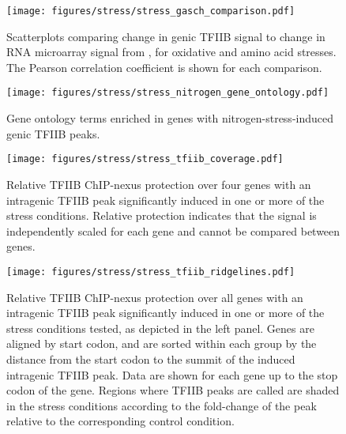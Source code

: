\begin{figure}[h]
    \centering
    \texttt{[image: figures/stress/stress\_gasch\_comparison.pdf]}
    \caption[Scatterplots comparing change in genic TFIIB signal to change in RNA microarray signal, for oxidative and amino acid stresses.]{Scatterplots comparing change in genic TFIIB signal to change in RNA microarray signal from \citet{gasch2000}, for oxidative and amino acid stresses. The Pearson correlation coefficient is shown for each comparison.}
    \label{fig:stress_gasch_comparison}
\end{figure}

\begin{figure}[h]
    \centering
    \texttt{[image: figures/stress/stress\_nitrogen\_gene\_ontology.pdf]}
    \caption[Gene ontology terms enriched in genes with nitrogen-stress-induced genic TFIIB peaks]{Gene ontology terms enriched in genes with nitrogen-stress-induced genic TFIIB peaks.}
    \label{fig:stress_nitrogen_gene_ontology}
\end{figure}

\begin{figure}[h]
    \texttt{[image: figures/stress/stress\_tfiib\_coverage.pdf]}
    \caption[TFIIB ChIP-nexus protection over four genes with stress-induced intragenic TFIIB peaks.]{Relative TFIIB ChIP-nexus protection over four genes with an intragenic TFIIB peak significantly induced in one or more of the stress conditions. Relative protection indicates that the signal is independently scaled for each gene and cannot be compared between genes.}
    \label{fig:stress_tfiib_coverage}
\end{figure}

\clearpage

\begin{sidewaysfigure}
    \texttt{[image: figures/stress/stress\_tfiib\_ridgelines.pdf]}
    \caption[TFIIB ChIP-nexus protection over all genes with stress-induced intragenic TFIIB peaks.]{Relative TFIIB ChIP-nexus protection over all genes with an intragenic TFIIB peak significantly induced in one or more of the stress conditions tested, as depicted in the left panel. Genes are aligned by start codon, and are sorted within each group by the distance from the start codon to the summit of the induced intragenic TFIIB peak. Data are shown for each gene up to the stop codon of the gene. Regions where TFIIB peaks are called are shaded in the stress conditions according to the fold-change of the peak relative to the corresponding control condition.}
    \label{fig:stress_tfiib_ridgelines}
\end{sidewaysfigure}

